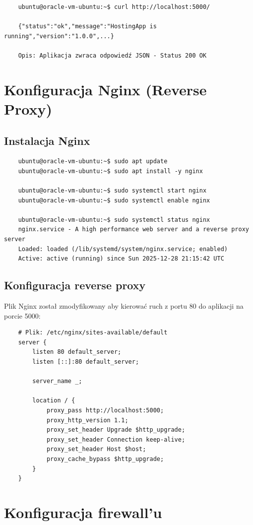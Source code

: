 \documentclass[twoside]{article}
\begin{document}
\begin{verbatim}
	ubuntu@oracle-vm-ubuntu:~$ curl http://localhost:5000/
	
	{"status":"ok","message":"HostingApp is running","version":"1.0.0",...}
	
	Opis: Aplikacja zwraca odpowiedź JSON - Status 200 OK
\end{verbatim}

\section{Konfiguracja Nginx (Reverse Proxy)}

\subsection{Instalacja Nginx}

\begin{verbatim}
	ubuntu@oracle-vm-ubuntu:~$ sudo apt update
	ubuntu@oracle-vm-ubuntu:~$ sudo apt install -y nginx
	
	ubuntu@oracle-vm-ubuntu:~$ sudo systemctl start nginx
	ubuntu@oracle-vm-ubuntu:~$ sudo systemctl enable nginx
	
	ubuntu@oracle-vm-ubuntu:~$ sudo systemctl status nginx
	nginx.service - A high performance web server and a reverse proxy server
	Loaded: loaded (/lib/systemd/system/nginx.service; enabled)
	Active: active (running) since Sun 2025-12-28 21:15:42 UTC
\end{verbatim}

\subsection{Konfiguracja reverse proxy}

Plik Nginx został zmodyfikowany aby kierować ruch z portu 80 do aplikacji na porcie 5000:

\begin{lstlisting}
	# Plik: /etc/nginx/sites-available/default
	server {
		listen 80 default_server;
		listen [::]:80 default_server;
		
		server_name _;
		
		location / {
			proxy_pass http://localhost:5000;
			proxy_http_version 1.1;
			proxy_set_header Upgrade $http_upgrade;
			proxy_set_header Connection keep-alive;
			proxy_set_header Host $host;
			proxy_cache_bypass $http_upgrade;
		}
	}
\end{lstlisting}

\section{Konfiguracja firewall'u}
\end{document}
